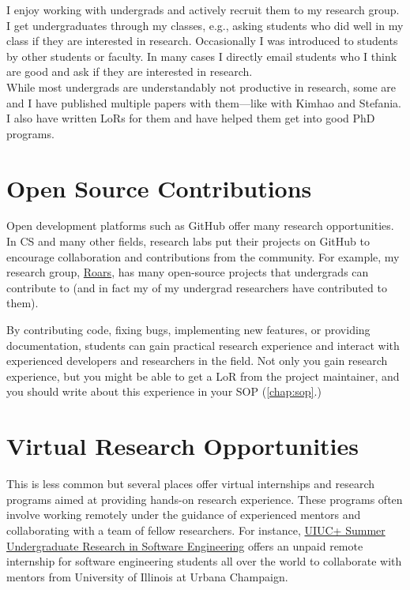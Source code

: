 \documentclass[oneside,11pt]{book}
\newenvironment{commentbox}[1][]{
  \small
  \begin{marker}[\faChessPawn{}]
    {\textbf{#1}}
  }{
  \end{marker}
}
\begin{document}
\begin{commentbox}
I enjoy working with undergrads and actively recruit them to my research group. I get undergraduates through my classes, e.g., asking students who did well in my class if they are interested in research.  Occasionally I was introduced to students by other students or faculty. In many cases I directly email students who I think are good and ask if they are interested in research. 
    \\

    While most undergrads are understandably not productive in research, some are and I have published multiple papers with them---like with Kimhao and Stefania.  
    I also have written LoRs for them and have helped them get into good PhD programs.
\end{commentbox}

\section{Open Source Contributions}\label{sec:open-source-contribs}

Open development platforms such as GitHub offer many research opportunities.
In CS and many other fields, research labs put their projects on GitHub to encourage collaboration and contributions from the community. For example, my research group, \href{https://roars.dev/}{Roars}, has many open-source projects that undergrads can contribute to (and in fact my of my undergrad researchers have contributed to them).

By contributing code, fixing bugs, implementing new features, or providing documentation, students can gain practical research experience and interact with experienced developers and researchers in the field. Not only you gain research experience, but you might be able to get a LoR from the project maintainer, and you should write about this experience in your SOP (\autoref{chap:sop}.)

\section{Virtual Research Opportunities} 
This is less common but several places offer virtual internships and research programs aimed at providing hands-on research experience. These programs often involve working remotely under the guidance of experienced mentors and collaborating with a team of fellow researchers. For instance, \href{https://docs.google.com/forms/d/1btIwt4HwjyKMOUk-EMy3rbkfWzFxv2lNrMm_zkd0pA4/viewform?edit_requested=true}{UIUC+ Summer Undergraduate Research in Software Engineering}  offers an unpaid remote internship for software engineering students all over the world to collaborate with mentors from University of Illinois at Urbana Champaign.
\end{document}

